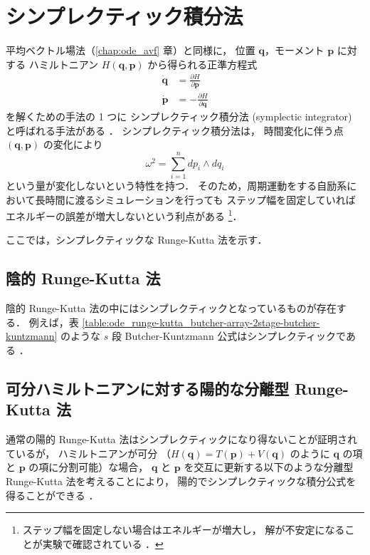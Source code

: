 %

\chapter{シンプレクティック積分法}\label{sec:ode_symplectic}

平均ベクトル場法（\ref{chap:ode_avf} 章）と同様に，
位置 $\bm{q}$，モーメント $\bm{p}$ に対する
ハミルトニアン $H(\bm{q}, \bm{p})$ から得られる正準方程式
\begin{align}
    \dot{\bm{q}} & = \frac{\partial H}{\partial \bm{p}}  \\
    \dot{\bm{p}} & = -\frac{\partial H}{\partial \bm{q}}
\end{align}
を解くための手法の 1 つに
シンプレクティック積分法 (symplectic integrator) と呼ばれる手法がある
\cite[Section II.16.]{Hairer1993}．
シンプレクティック積分法は，
時間変化に伴う点 $(\bm{q}, \bm{p})$ の変化により
\begin{equation}
    \omega^2 = \sum_{i=1}^{n} dp_i \wedge dq_i
\end{equation}
という量が変化しないという特性を持つ．
そのため，周期運動をする自励系において長時間に渡るシミュレーションを行っても
ステップ幅を固定していればエネルギーの誤差が増大しないという利点がある
\cite{Yoshida2013}
\footnote{ステップ幅を固定しない場合はエネルギーが増大し，%
    解が不安定になることが実験で確認されている%
    \cite[Section II.16.]{Hairer1993}．}．

ここでは，シンプレクティックな Runge-Kutta 法を示す．

\section{陰的 Runge-Kutta 法}

陰的 Runge-Kutta 法の中にはシンプレクティックとなっているものが存在する．
例えば，表 \ref{table:ode_runge-kutta_butcher-array-2stage-butcher-kuntzmann} のような
$s$ 段 Butcher-Kuntzmann 公式はシンプレクティックである
\cite[Section II.16.]{Hairer1993}．

\section{可分ハミルトニアンに対する陽的な分離型 Runge-Kutta 法}

通常の陽的 Runge-Kutta 法はシンプレクティックになり得ないことが証明されているが，
ハミルトニアンが可分
（$H(\bm{q}) = T(\bm{p}) + V(\bm{q})$ のように
$\bm{q}$ の項と $\bm{p}$ の項に分割可能）な場合，
$\bm{q}$ と $\bm{p}$ を交互に更新する以下のような分離型 Runge-Kutta 法を考えることにより，
陽的でシンプレクティックな積分公式を得ることができる
\cite[Section II.16.]{Hairer1993}．

